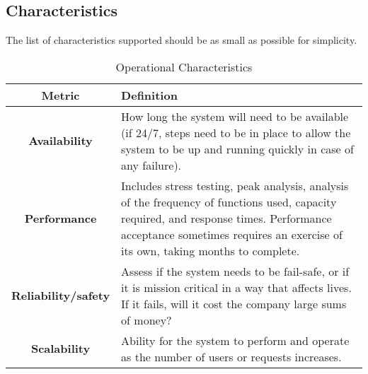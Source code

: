 \documentclass[11pt]{scrartcl} %
\begin{document}
\subsection{Characteristics}

The list of characteristics supported should be as small as possible for simplicity.

\begin{table}
  \centering
  \begin{tabular}{|c|p{8cm}|}
    \hline
    \textbf{Metric} & \textbf{Definition} \\ \hline
    \textbf{Availability} & How long the system will need to be available (if 24/7, steps need to be in place to allow the system to be up and running quickly in case of any failure). \\ \hline
    \textbf{Performance} & Includes stress testing, peak analysis, analysis of the frequency of functions used, capacity required, and response times. Performance acceptance sometimes requires an exercise of its own, taking months to complete. \\ \hline
    \textbf{Reliability/safety} & Assess if the system needs to be fail-safe, or if it is mission critical in a way that affects lives. If it fails, will it cost the company large sums of money? \\ \hline
    \textbf{Scalability} & Ability for the system to perform and operate as the number of users or requests increases. \\ \hline
  \end{tabular}
  \caption{Operational Characteristics}
\end{table}
\end{document}
